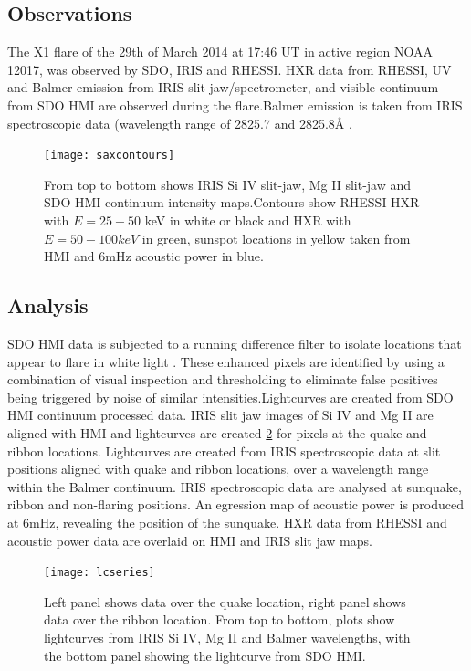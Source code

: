\subsection{Observations}
The X1 flare of the 29th of March 2014 at 17:46 UT in active region NOAA 12017, was observed by SDO, IRIS and RHESSI. HXR data from RHESSI, UV and Balmer emission from IRIS slit-jaw/spectrometer, and visible continuum from SDO HMI are observed during the flare.Balmer emission is taken from IRIS spectroscopic data (wavelength range of 2825.7 and 2825.8Å \citep{2014ApJ...794L..23H}. \\

\begin{figure}\label{saxcontours}
  \begin{center}
  \texttt{[image: saxcontours]}
  \end{center}
  \caption{From top to bottom shows IRIS Si IV slit-jaw, Mg II slit-jaw and SDO HMI continuum intensity maps.Contours show RHESSI HXR with $E = 25-50$ keV in white or black and HXR with $E = 50-100 keV$ in green, sunspot locations in yellow taken from HMI and 6mHz acoustic power in blue.}
\end{figure}



\subsection{Analysis}
SDO HMI data is subjected to a running difference filter to isolate locations that appear to flare in white light . These enhanced pixels are identified by using a combination of visual inspection and thresholding to eliminate false positives being triggered by noise of similar intensities.Lightcurves are created from SDO HMI continuum processed data. IRIS slit jaw images of Si IV and Mg II are aligned with HMI and lightcurves are created \ref{lcseries} for pixels at the quake and ribbon locations. Lightcurves are created from IRIS spectroscopic data at slit positions aligned with quake and ribbon locations, over a wavelength range within the Balmer continuum. IRIS spectroscopic data are analysed at sunquake, ribbon and non-flaring positions. An egression map of acoustic power is produced  at 6mHz, revealing the position of the sunquake. HXR data from RHESSI and acoustic power data are overlaid on HMI and IRIS slit jaw maps.\\

\begin{figure}\label{lcseries}
  \begin{center} 
\texttt{[image: lcseries]}
  \end{center}
  \caption{Left panel shows data over the quake location, right panel shows data over the ribbon location. From top to bottom, plots show lightcurves from IRIS Si IV, Mg II and Balmer wavelengths, with the bottom panel showing the lightcurve from SDO HMI. }
\end{figure}


